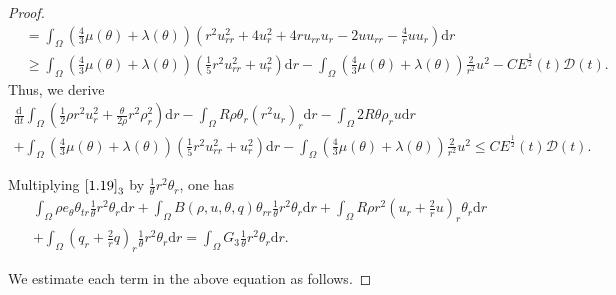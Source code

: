 \documentclass[11pt,reqno]{amsart}
\numberwithin{equation}{section}
\newcommand{\dif}{\mathrm{d}}
\begin{document}
\begin{proof}
\begin{align*}
  &=\int_{\Omega} \left(\frac{4}{3} \mu(\theta)+\lambda(\theta)\right) \left( r^2 u_{rr}^2+4u_r^2+4r u_{rr} u_r -2 u u_{rr}-\frac{4}{r} u u_r\right)\dif r\\
  &\ge   \int_{\Omega} \left(\frac{4}{3} \mu(\theta)+\lambda(\theta)\right)\left(\frac{1}{5} r^2 u_{rr}^2+u_r^2\right) \dif r-   \int_{\Omega} \left(\frac{4}{3} \mu(\theta)+\lambda(\theta)\right)\frac{2}{r^2} u^2-C E^\frac{1}{2}(t) \mathcal D(t).
  \end{align*}
 Thus, we derive
 \begin{align}\label{1.20}
 \frac{\dif}{\dif t} \int_{\Omega} \left( \frac{1}{2} \rho r^2 u_r^2 +\frac{\theta}{2\rho} r^2 \rho_r^2\right) \dif r -\int_{\Omega} R \rho \theta_r (r^2 u_r)_r\dif r-\int_{\Omega} 2 R \theta \rho_r u \dif r  \nonumber\\
  +\int_{\Omega} \left(\frac{4}{3} \mu(\theta)+\lambda(\theta)\right)\left(\frac{1}{5} r^2 u_{rr}^2+u_r^2\right) \dif r-   \int_{\Omega} \left(\frac{4}{3} \mu(\theta)+\lambda(\theta)\right)\frac{2}{r^2} u^2\le C E^\frac{1}{2}(t) \mathcal D(t).
 \end{align}

 Multiplying $\eqref{1.19}_3$ by $\frac{1}{\theta} r^2 \theta_r$, one has
 \begin{align}
 \int_{\Omega} \rho e_\theta \theta_{tr}  \frac{1}{\theta} r^2 \theta_r\dif r+ \int_{\Omega} B(\rho, u, \theta, q) \theta_{rr} \frac{1}{\theta} r^2 \theta_r \dif r+\int_{\Omega} R\rho r^2\left(u_r+\frac{2}{r} u\right)_r \theta_r \dif r \nonumber\\
 +\int_{\Omega} \left( q_r+\frac{2}{r} q\right)_r \frac{1}{\theta} r^2 \theta_r \dif r=\int_{\Omega} G_3 \frac{1}{\theta} r^2 \theta_r \dif r  .\label{1.21}
 \end{align}

 We estimate each term in the above equation as follows.


\end{proof}
\end{document}
